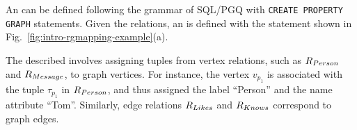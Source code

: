 \begin{example}
    \label{ex:rgmapping}
    An \rgmapping can be defined following the grammar of SQL/PGQ with \lstinline{CREATE PROPERTY GRAPH} statements.
    Given the relations, an \rgmapping is defined with the statement shown in Fig.~\ref{fig:intro-rgmapping-example}(a).

    The described \rgmapping involves assigning tuples from vertex relations, such as ${R_{Person}}$ and ${R_{Message}}$, to graph vertices. For instance, the vertex $v_{p_1}$ is associated with the tuple $\tau_{p_1}$ in ${R_{Person}}$, and thus assigned the label ``Person'' and the name attribute ``Tom''. Similarly, edge relations ${R_{Likes}}$ and ${R_{Knows}}$ correspond to graph edges.

\end{example}
